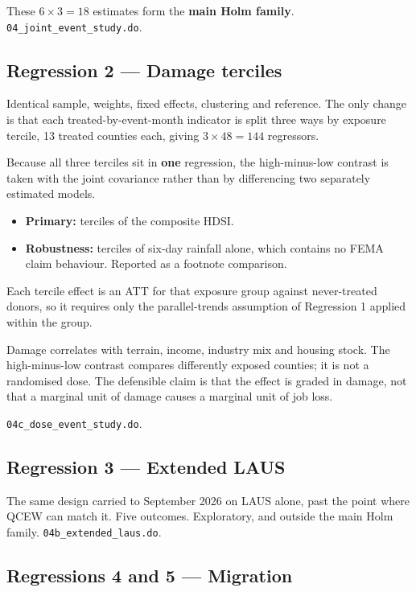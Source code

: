 \documentclass[11pt,a4paper]{article}
\newcommand{\caution}[2]{\begin{tcolorbox}[warnbox,title={#1}]#2\end{tcolorbox}}
\newcommand{\file}[1]{\texttt{\small #1}}
\begin{document}
These $6\times3=18$ estimates form the \textbf{main Holm family}.
\file{04\_joint\_event\_study.do}.

\subsection{Regression 2 --- Damage terciles}

Identical sample, weights, fixed effects, clustering and reference. The only
change is that each treated-by-event-month indicator is split three ways by
exposure tercile, 13 treated counties each, giving $3\times48=144$ regressors.

Because all three terciles sit in \textbf{one} regression, the high-minus-low
contrast is taken with the joint covariance rather than by differencing two
separately estimated models.

\begin{itemize}[leftmargin=1.3em,itemsep=2pt]
\item \textbf{Primary:} terciles of the composite HDSI.
\item \textbf{Robustness:} terciles of six-day rainfall alone, which contains
      no FEMA claim behaviour. Reported as a footnote comparison.
\end{itemize}

Each tercile effect is an ATT for that exposure group against never-treated
donors, so it requires only the parallel-trends assumption of Regression 1
applied within the group.

\caution{Exposure is not randomly assigned}{%
Damage correlates with terrain, income, industry mix and housing stock. The
high-minus-low contrast compares differently exposed counties; it is not a
randomised dose. The defensible claim is that the effect is graded in damage,
not that a marginal unit of damage causes a marginal unit of job loss.}

\file{04c\_dose\_event\_study.do}.

\subsection{Regression 3 --- Extended LAUS}

The same design carried to September 2026 on LAUS alone, past the point where
QCEW can match it. Five outcomes. Exploratory, and outside the main Holm
family. \file{04b\_extended\_laus.do}.

\subsection{Regressions 4 and 5 --- Migration}
\end{document}
